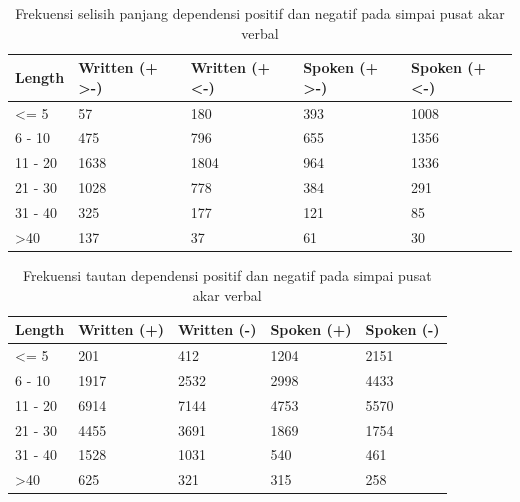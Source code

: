 \documentclass[10pt, a4paper, conference, compsocconf]{IEEEtran}
\begin{document}
\begin{table}
\begin{center}
\caption{Frekuensi selisih panjang dependensi positif dan negatif pada simpai pusat akar verbal}  \label{tab:DLpusatposneg}
\begin{tabular}{p{1.1cm} p{1.2cm} p{1.2cm} p{1.3cm} p{1.3cm}}
\hline
Length & Written (+ \textgreater -) & Written (+ \textless -) & Spoken (+ \textgreater -) & Spoken (+ \textless -) \\ \hline
\textless= 5 	& 57	 	& 180 	& 393 & 1008 \\
6 - 10 		& 475 	& 796	& 655 & 1356 \\ 
11 - 20 		& 1638	& 1804	& 964 & 1336 \\
21 - 30 		& 1028	& 778	& 384 & 291 \\
31 - 40 		& 325	& 177	& 121 & 85 \\
\textgreater 40 	& 137	& 37	 	& 61 & 30 \\ \hline
   \end{tabular}
\end{center}
\end{table}

\begin{table}
\begin{center}
\caption{Frekuensi tautan dependensi positif dan negatif pada simpai pusat akar verbal}  \label{tab:tautanpusatposneg}
\begin{tabular}{p{1.1cm} p{1.2cm} p{1.2cm} p{1.3cm} p{1.3cm}}
    \hline
Length & Written (+) & Written (-) & Spoken (+) & Spoken (-) \\ \hline
\textless= 5 	& 201	& 412 & 1204 & 2151 \\
6 - 10 		& 1917	& 2532 & 2998 & 4433 \\
11 - 20 		& 6914 	& 7144 & 4753 & 5570 \\
21 - 30 		& 4455	& 3691 & 1869 & 1754 \\
31 - 40 		& 1528	& 1031 & 540 & 461 \\
\textgreater 40 	& 625	& 321 & 315 & 258 \\ \hline
   \end{tabular}
\end{center}
\end{table}
\end{document}
